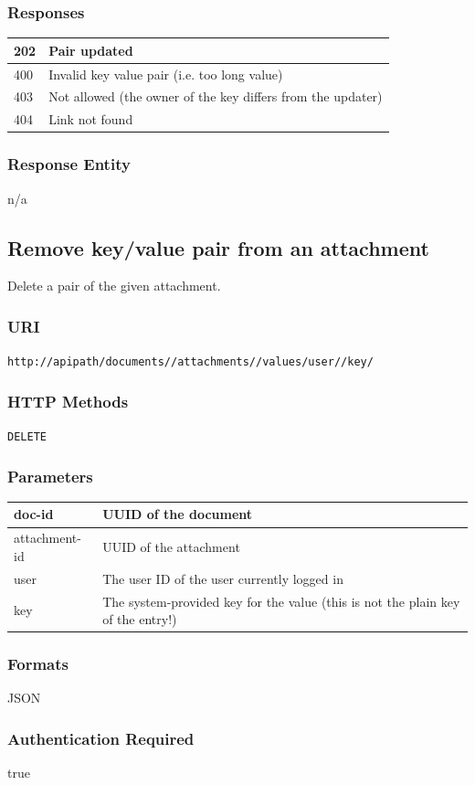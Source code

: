 \documentclass[10pt]{article}
\begin{document}
\subsubsection{Responses}
\begin{tabular}{|l|l|}\hline
202 & Pair updated \\
\hline
400 & Invalid key value pair (i.e. too long value) \\
\hline
403 & Not allowed (the owner of the key differs from the updater) \\
\hline
404 & Link not found \\
\hline
\end{tabular}
\subsubsection{Response Entity}
n/a
\subsection{Remove key/value pair from an attachment}
Delete a pair of the given attachment.
\subsubsection{URI}
\texttt{http://apipath/documents//attachments//values/user//key/
}\subsubsection{HTTP Methods}
\texttt{DELETE}
\subsubsection{Parameters}
\begin{tabular}{|l|l|}\hline
doc-id & UUID of the document \\
\hline
attachment-id & UUID of the attachment \\
\hline
user & The user ID of the user currently logged in \\
\hline
key & The system-provided key for the value (this is not the plain key of the entry!) \\
\hline
\end{tabular}
\subsubsection{Formats}
JSON
\subsubsection{Authentication Required}
true
\end{document}
